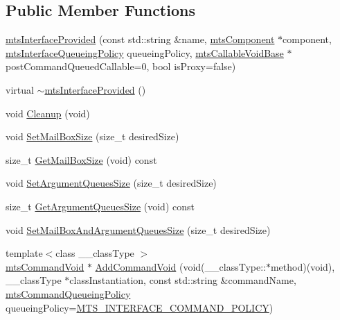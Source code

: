 \subsection*{Public Member Functions}
\begin{DoxyCompactItemize}
\item 
\hyperlink{classmts_interface_provided_a6712188f9a49482f9ed5b31e738bf15d}{mts\-Interface\-Provided} (const std\-::string \&name, \hyperlink{classmts_component}{mts\-Component} $\ast$component, \hyperlink{mts_forward_declarations_8h_abedfb5c45b329a89b0fb647a96a7c938}{mts\-Interface\-Queueing\-Policy} queueing\-Policy, \hyperlink{classmts_callable_void_base}{mts\-Callable\-Void\-Base} $\ast$post\-Command\-Queued\-Callable=0, bool is\-Proxy=false)
\item 
virtual \hyperlink{classmts_interface_provided_aff3337b8fc5eba462f092a5a1d20cb0e}{$\sim$mts\-Interface\-Provided} ()
\item 
void \hyperlink{classmts_interface_provided_af428e5d63e5b27dfc3c141f17da26261}{Cleanup} (void)
\item 
void \hyperlink{classmts_interface_provided_aefa3e9ac82cb5f721f97fe919c53fae9}{Set\-Mail\-Box\-Size} (size\-\_\-t desired\-Size)
\item 
size\-\_\-t \hyperlink{classmts_interface_provided_ab1acfab12dd1d09a05f287185898ea05}{Get\-Mail\-Box\-Size} (void) const 
\item 
void \hyperlink{classmts_interface_provided_a2e4c89fa4b335e159d3f2870e92ddaa4}{Set\-Argument\-Queues\-Size} (size\-\_\-t desired\-Size)
\item 
size\-\_\-t \hyperlink{classmts_interface_provided_a9012af2e8998b8c9fa2f4ac5bab6a121}{Get\-Argument\-Queues\-Size} (void) const 
\item 
void \hyperlink{classmts_interface_provided_ab27d45daf220e7818ed5b4b485a6cacf}{Set\-Mail\-Box\-And\-Argument\-Queues\-Size} (size\-\_\-t desired\-Size)
\item 
{\footnotesize template$<$class \-\_\-\-\_\-class\-Type $>$ }\\\hyperlink{classmts_command_void}{mts\-Command\-Void} $\ast$ \hyperlink{classmts_interface_provided_aaf729c49f57f0089610e7e8e0638e76a}{Add\-Command\-Void} (void(\-\_\-\-\_\-class\-Type\-::$\ast$method)(void), \-\_\-\-\_\-class\-Type $\ast$class\-Instantiation, const std\-::string \&command\-Name, \hyperlink{mts_forward_declarations_8h_aa2ac24035e136fa1689dcc2854c63fc7}{mts\-Command\-Queueing\-Policy} queueing\-Policy=\hyperlink{mts_forward_declarations_8h_aa2ac24035e136fa1689dcc2854c63fc7a4f444b4120a5e2efd084e2e5a214f5c8}{M\-T\-S\-\_\-\-I\-N\-T\-E\-R\-F\-A\-C\-E\-\_\-\-C\-O\-M\-M\-A\-N\-D\-\_\-\-P\-O\-L\-I\-C\-Y})

\end{DoxyCompactItemize}
